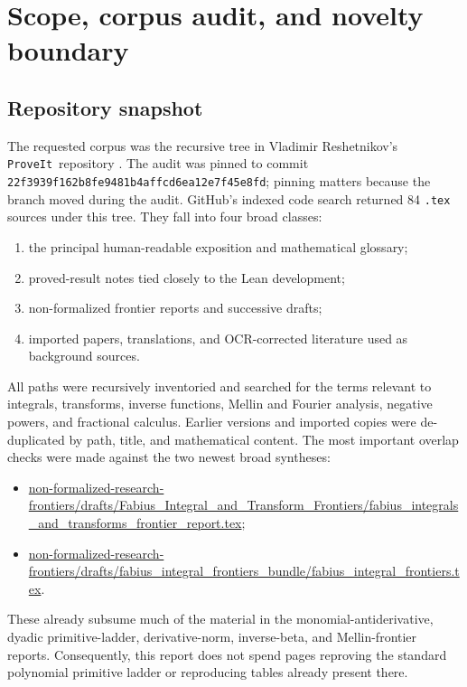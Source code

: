 \documentclass[11pt,oneside]{article}
\theoremstyle{definition}
\theoremstyle{remark}
\newcommand{\repo}{\texttt{ProveIt}}
\newcommand{\pathcode}[1]{\texttt{\detokenize{#1}}}
\begin{document}
\tableofcontents
\newpage

\section{Scope, corpus audit, and novelty boundary}
\label{sec:scope}

\subsection{Repository snapshot}

The requested corpus was the recursive tree
\pathcode{Analysis/FabiusFunction/docs} in Vladimir Reshetnikov's
\repo\ repository \cite{ProveIt}.  The audit was pinned to commit
\texttt{22f3939f162b8fe9481b4\allowbreak affcd6ea12e7f45e8fd}; pinning matters because the
branch moved during the audit.  GitHub's indexed code search returned 84
\texttt{.tex} sources under this tree.  They fall into four broad classes:

\begin{enumerate}
\item the principal human-readable exposition and mathematical glossary;
\item proved-result notes tied closely to the Lean development;
\item non-formalized frontier reports and successive drafts;
\item imported papers, translations, and OCR-corrected literature used as
      background sources.
\end{enumerate}

All paths were recursively inventoried and searched for the terms relevant to
integrals, transforms, inverse functions, Mellin and Fourier analysis,
negative powers, and fractional calculus.  Earlier versions and imported
copies were de-duplicated by path, title, and mathematical content.  The most
important overlap checks were made against the two newest broad syntheses:

\begin{itemize}
\item \url{non-formalized-research-frontiers/drafts/Fabius_Integral_and_Transform_Frontiers/fabius_integrals_and_transforms_frontier_report.tex};
\item \url{non-formalized-research-frontiers/drafts/fabius_integral_frontiers_bundle/fabius_integral_frontiers.tex}.
\end{itemize}

These already subsume much of the material in the monomial-antiderivative,
dyadic primitive-ladder, derivative-norm, inverse-beta, and Mellin-frontier
reports.  Consequently, this report does not spend pages reproving the
standard polynomial primitive ladder or reproducing tables already present
there.
\end{document}
